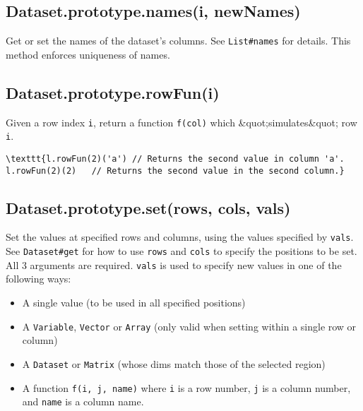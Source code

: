 \documentclass{article}
\begin{document}
    \subsection*{Dataset.prototype.names(i, newNames)}
    Get or set the names of the dataset's columns. See \texttt{List\#names} for
details. This method enforces uniqueness of names.


    \subsection*{Dataset.prototype.rowFun(i)}
    Given a row index \texttt{i}, return a function \texttt{f(col)} which \&quot;simulates\&quot; row \texttt{i}.


\begin{lstlisting}
\texttt{l.rowFun(2)('a') // Returns the second value in column 'a'.
l.rowFun(2)(2)   // Returns the second value in the second column.}\end{lstlisting}

    \subsection*{Dataset.prototype.set(rows, cols, vals)}
    Set the values at specified rows and columns, using the values specified by
\texttt{vals}. See \texttt{Dataset\#get} for how to use \texttt{rows} and \texttt{cols} to specify the
positions to be set. All 3 arguments are required.
\texttt{vals} is used to specify new values in one of the following ways:


\begin{itemize}

\item A single value (to be used in all specified positions)

\item A \texttt{Variable}, \texttt{Vector} or \texttt{Array} (only valid when setting within a single
row or column)

\item A \texttt{Dataset} or \texttt{Matrix} (whose dims match those of the selected region)

\item A function \texttt{f(i, j, name)} where \texttt{i} is a row number, \texttt{j} is a column number,
and \texttt{name} is a column name.

\end{itemize}
\end{document}
